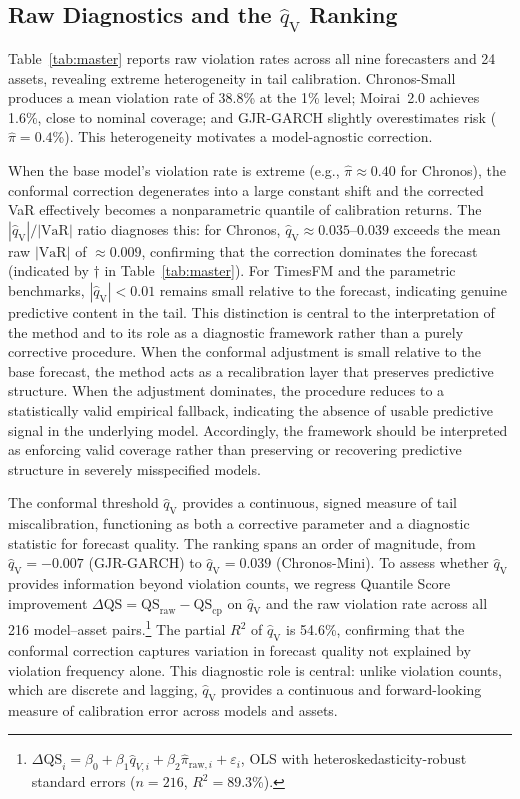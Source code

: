 \documentclass[preprint,11pt,authoryear]{elsarticle}
\newcommand{\VaR}{\mathrm{VaR}}
\newcommand{\1}{\boldsymbol{1}}
\newcommand{\qV}{\hat{q}_{\scriptscriptstyle\mathrm{V}}}
\begin{document}
	\subsection{Raw Diagnostics and the $\qV$ Ranking}
	\label{sec:results_raw}
	\label{sec:diagnostic}
	
	Table~\ref{tab:master} reports raw violation rates across all
	nine forecasters and 24 assets, revealing extreme heterogeneity
	in tail calibration. Chronos-Small produces a mean violation
	rate of 38.8\% at the 1\% level; Moirai~2.0 achieves 1.6\%,
	close to nominal coverage; and GJR-GARCH slightly overestimates
	risk ($\hat\pi = 0.4$\%). This heterogeneity motivates a
	model-agnostic correction.
	
	When the base model's violation rate is extreme (e.g.,
	$\hat\pi \approx 0.40$ for Chronos), the conformal correction
	degenerates into a large constant shift and the corrected VaR
	effectively becomes a nonparametric quantile of calibration
	returns. The $|\qV|/|\VaR|$ ratio diagnoses this: for
	Chronos, $\qV \approx 0.035$--$0.039$ exceeds the mean raw
	$|\VaR|$ of $\approx 0.009$, confirming that the correction
	dominates the forecast (indicated by $\dagger$ in
	Table~\ref{tab:master}). For TimesFM and the parametric
	benchmarks, $|\qV| < 0.01$ remains small relative to the
	forecast, indicating genuine predictive content in the tail.
	This distinction is central to the interpretation of the method and to its role as a diagnostic framework rather than a purely corrective procedure. When the conformal adjustment is small relative to the base forecast, the method acts as a recalibration layer that preserves predictive structure. When the adjustment dominates, the procedure reduces to a statistically valid empirical fallback, indicating the absence of usable predictive signal in the underlying model.
	Accordingly, the framework should be interpreted as enforcing valid coverage rather than preserving or recovering predictive structure in severely misspecified models.

	The conformal threshold $\qV$ provides a continuous, signed
	measure of tail miscalibration, functioning as both a corrective parameter and a diagnostic statistic for forecast quality. The ranking spans an order of
	magnitude, from $\qV = -0.007$ (GJR-GARCH) to $\qV = 0.039$
	(Chronos-Mini). To assess whether $\qV$ provides information
	beyond violation counts, we regress Quantile Score improvement
	$\Delta\mathrm{QS} = \mathrm{QS}_{\mathrm{raw}} -
	\mathrm{QS}_{\mathrm{cp}}$ on $\qV$ and the raw violation
	rate across all 216 model--asset
	pairs.\footnote{$\Delta\mathrm{QS}_i = \beta_0 + \beta_1
		\hat{q}_{V,i} + \beta_2 \hat\pi_{\mathrm{raw},i} +
		\varepsilon_i$, OLS with heteroskedasticity-robust standard
		errors ($n = 216$, $R^2 = 89.3$\%).} The partial $R^2$ of
	$\qV$ is 54.6\%, confirming that the conformal correction
	captures variation in forecast quality not explained by
	violation frequency alone.
	This diagnostic role is central: unlike violation counts, which are discrete and lagging, $\qV$ provides a continuous and forward-looking measure of calibration error across models and assets.
\end{document}
